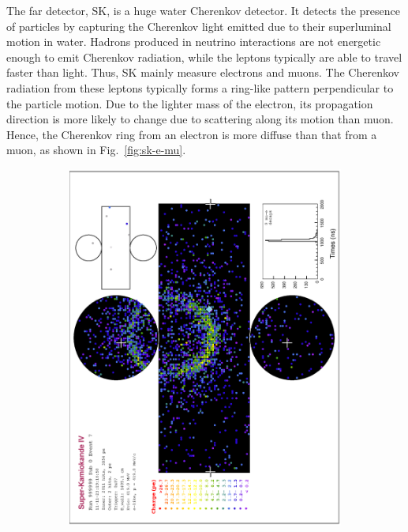   The far detector, SK, is a huge water Cherenkov detector.
  It detects the presence of particles by capturing the Cherenkov light emitted due to their superluminal motion in water.
  Hadrons produced in neutrino interactions are not energetic enough to emit Cherenkov radiation, while the leptons typically are able to travel faster than light.
  Thus, SK mainly measure electrons and muons.
  The Cherenkov radiation from these leptons typically forms a ring-like pattern perpendicular to the particle motion.
  Due to the lighter mass of the electron, its propagation direction is more likely to change due to scattering along its motion than muon.
  Hence, the Cherenkov ring from an electron is more diffuse than that from a muon, as shown in Fig.~\ref{fig:sk-e-mu}.
  \begin{figure}
        \centering
        \begin{subfigure}[b]{\dbfigwid\textwidth}
             \centering
             \includegraphics[width=\textwidth]{figures/t2k/sk-nue.eps}

\end{subfigure}
\end{figure}
